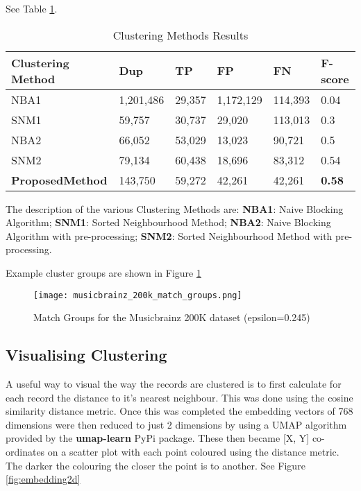 \documentclass{article}
\begin{document}
See Table \ref{tab:comparisontable}.
\begin{table}[h]
 \caption{Clustering Methods Results}
  \begin{tabular}{|l|l|l|l|l|l|}
    \hline
    \textbf{Clustering Method} & \textbf{Dup} & \textbf{TP} & \textbf{FP} & \textbf{FN} & \textbf{F-score} \\
    \hline\hline
    NBA1 & 1,201,486 & 29,357 & 1,172,129 & 114,393 & 0.04 \\
    \hline
    SNM1 & 59,757 & 30,737 & 29,020 & 113,013 & 0.3 \\
    \hline
    NBA2 & 66,052 & 53,029 & 13,023 & 90,721 & 0.5 \\
    \hline
    SNM2 & 79,134 & 60,438 & 18,696 & 83,312 & 0.54 \\
    \hline
    \textbf{ProposedMethod} & 143,750 & 59,272 & 42,261 & 42,261 & \textbf{0.58} \\
    \hline
  \end{tabular}
  \label{tab:comparisontable}
\end{table}

The description of the various Clustering Methods are:
\textbf{NBA1}: Naive Blocking Algorithm;
\textbf{SNM1}: Sorted Neighbourhood Method;
\textbf{NBA2}: Naive Blocking Algorithm with pre-processing;
\textbf{SNM2}: Sorted Neighbourhood Method with pre-processing.

Example cluster groups are shown in Figure \ref{fig:matchgroups}
\begin{figure}[h]
\texttt{[image: musicbrainz\_200k\_match\_groups.png]}
\caption{Match Groups for the Musicbrainz 200K dataset (epsilon=0.245)}
\label{fig:matchgroups}
\end{figure} %

\subsection{Visualising Clustering}
A useful way to visual the way the records are clustered is to first calculate for each record the distance to it’s nearest neighbour. This was done using the cosine similarity distance metric. Once this was completed the embedding vectors of 768 dimensions were then reduced to just 2 dimensions by using a UMAP \cite{2018arXivUMAP} algorithm provided by the \textbf{umap-learn}\cite{umap-learn} PyPi package. These then became [X, Y] co-ordinates on a scatter plot with each point coloured using the distance metric. The darker the colouring the closer the point is to another. See Figure \ref{fig:embedding2d}
\end{document}
